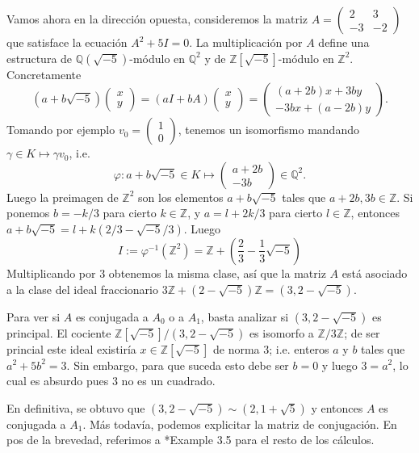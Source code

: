 \documentclass[11pt,a4paper]{amsart}
\newcommand{\Q}{\mathbb{Q}}
\newcommand{\Z}{\mathbb{Z}}
\numberwithin{equation}{section}
\theoremstyle{plain}
\begin{document}
Vamos ahora en la dirección opuesta, consideremos la matriz
$A = \begin{pmatrix}2 & 3 \\ -3 & -2 \end{pmatrix}$ que
satisface la ecuación $A^2 + 5 I = 0$. La multiplicación
por $A$ define una estructura de $\Q(\sqrt{-5})$-módulo
en $\Q^2$ y de $\Z[\sqrt{-5}]$-módulo en $\Z^2$. Concretamente
\[
(a+b\sqrt{-5})\begin{pmatrix}x\\ y\end{pmatrix}
= (aI+bA)\begin{pmatrix}x\\ y\end{pmatrix}
= \begin{pmatrix}(a+2b)x+3by\\-3bx + (a-2b)y\end{pmatrix}.
\]
Tomando por ejemplo $v_0 =\begin{pmatrix} 1 \\ 0\end{pmatrix}$,
tenemos un isomorfismo mandando $\gamma \in K \mapsto \gamma v_0$, i.e.
\[
\varphi \colon
a+b\sqrt{-5} \in K \longmapsto \begin{pmatrix}a+2b\\-3b\end{pmatrix} \in \Q^2.
\]
Luego la preimagen de $\Z^2$ son los elementos $a+b\sqrt{-5}$
tales que $a+2b, 3b \in \Z$. Si ponemos $b = -k/3$ para cierto $k \in \Z$,
y $a = l+2k/3$ para cierto $l \in \Z$, entonces $a+b\sqrt{-5}
= l + k(2/3-\sqrt{-5}/3)$. Luego
\[
I := \varphi^{-1}(\Z^2) =
\Z + \left(\frac{2}{3}-\frac{1}{3}\sqrt{-5}\right)
\]
Multiplicando por $3$ obtenemos la misma clase, así que la matriz $A$
está asociado a la clase del ideal fraccionario $3\Z+(2-\sqrt{-5})\Z
= (3,2-\sqrt{-5})$.

Para ver si $A$ es conjugada a $A_0$ o a $A_1$,
basta analizar si $(3,2-\sqrt{-5})$ es principal. El cociente
$\Z[\sqrt{-5}]/(3,2-\sqrt{-5})$ es isomorfo a $\Z/3\Z$; de ser
princial este ideal existiría $x \in \Z[\sqrt{-5}]$ de norma $3$;
i.e. enteros $a$ y $b$ tales que $a^2+5b^2 = 3$. Sin embargo,
para que suceda esto debe ser $b = 0$ y luego $3 = a^2$, lo cual
es absurdo pues $3$ no es un cuadrado.

En definitiva, se obtuvo que $(3,2-\sqrt{-5}) \sim (2,1+\sqrt{5})$
y entonces $A$ es conjugada a $A_1$. Más todavía, podemos
explicitar la matriz de conjugación. En pos de la brevedad,
referimos a \cite{KCd}*{Example 3.5} para el resto de los cálculos.
\end{document}
